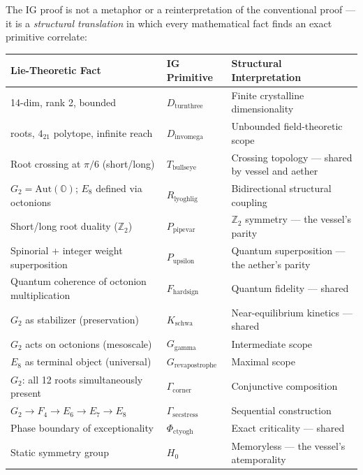 \documentclass[12pt,a4paper]{article}
\begin{document}
The IG proof is not a metaphor or a reinterpretation of the conventional proof --- it is a \emph{structural translation} in which every mathematical fact finds an exact primitive correlate:

\begin{table}[htbp]
\centering
\small
{}
\begin{tabularx}{\textwidth}{>{\centering\arraybackslash}X >{\centering\arraybackslash}X >{\centering\arraybackslash}X}
\toprule
\rowcolor{gray!25}\textbf{Lie-Theoretic Fact} & \textbf{IG Primitive} & \textbf{Structural Interpretation} \\
\midrule
\rowcolors{1}{white}{gray!10}
14-dim, rank 2, bounded & $D_{\text{turnthree}}$ & Finite crystalline dimensionality \\
240 roots, $4_{21}$ polytope, infinite reach & $D_{\text{invomega}}$ & Unbounded field-theoretic scope \\
Root crossing at $\pi/6$ (short/long) & $T_{\text{bullseye}}$ & Crossing topology --- shared by vessel and aether \\
$G_2 = \text{Aut}(\mathbb{O})$; $E_8$ defined via octonions & $R_{\text{lyoghlig}}$ & Bidirectional structural coupling \\
Short/long root duality ($\mathbb{Z}_2$) & $P_{\text{pipevar}}$ & $\mathbb{Z}_2$ symmetry --- the vessel's parity \\
Spinorial + integer weight superposition & $P_{\text{upsilon}}$ & Quantum superposition --- the aether's parity \\
Quantum coherence of octonion multiplication & $F_{\text{hardsign}}$ & Quantum fidelity --- shared \\
$G_2$ as stabilizer (preservation) & $K_{\text{schwa}}$ & Near-equilibrium kinetics --- shared \\
$G_2$ acts on octonions (mesoscale) & $G_{\text{gamma}}$ & Intermediate scope \\
$E_8$ as terminal object (universal) & $G_{\text{revapostrophe}}$ & Maximal scope \\
$G_2$: all 12 roots simultaneously present & $\Gamma_{\text{corner}}$ & Conjunctive composition \\
$G_2 \to F_4 \to E_6 \to E_7 \to E_8$ & $\Gamma_{\text{secstress}}$ & Sequential construction \\
Phase boundary of exceptionality & $\Phi_{\text{ctyogh}}$ & Exact criticality --- shared \\
Static symmetry group & $H_0$ & Memoryless --- the vessel's atemporality \\

\end{tabularx}
\end{table}
\end{document}
